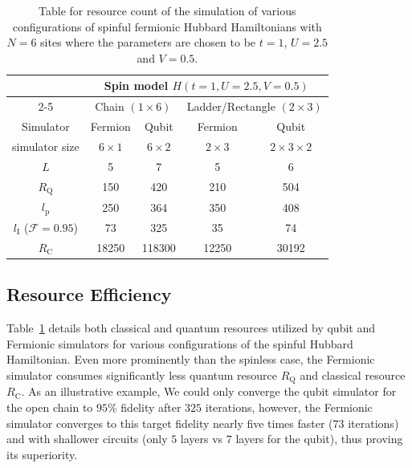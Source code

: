 \documentclass[aps, prx, reprint, superscriptaddress]{revtex4-2}
\begin{document}
\begin{table}[t]
\begin{tabular}{|c|cccc|}
\hline
&\multicolumn{4}{c|}{Spin model $H(t{=}1,U{=}2.5,V{=}0.5)$ }\\ 
\cline{2-5} 
\multirow{3}{*}{} &  
\multicolumn{2}{c|}{Chain $(1{\times} 6)$}  & 
\multicolumn{2}{c|}{Ladder/Rectangle $(2{\times} 3)$} \\ 
\hline
Simulator     & 
\multicolumn{1}{c|}{Fermion} & 
\multicolumn{1}{c|}{Qubit} & 
\multicolumn{1}{c|}{Fermion} & 
\multicolumn{1}{c|}{Qubit} \\ 
\hline
simulator size &  
\multicolumn{1}{c|}{$6{\times} 1$} & 
\multicolumn{1}{c|}{$6{\times} 2$} & 
\multicolumn{1}{c|}{$2{\times} 3$} &
\multicolumn{1}{c|}{$2{\times} 3{\times} 2$}  \\ 
\hline
$L$        &        
\multicolumn{1}{c|}{5} & 
\multicolumn{1}{c|}{7} & 
\multicolumn{1}{c|}{5} & 6     \\ 
\hline
$R_\text{Q}$  & 
\multicolumn{1}{c|}{150} & 
\multicolumn{1}{c|}{420} & 
\multicolumn{1}{c|}{210} & 504   \\ 
\hline
$l_\text{p}$           & 
\multicolumn{1}{c|}{250} & 
\multicolumn{1}{c|}{364} & 
\multicolumn{1}{c|}{350} & 408   \\ 
\hline
$l_{\text{I}}$ ($\mathcal{F}{=}0.95$)                 
& \multicolumn{1}{c|}{73}      
& \multicolumn{1}{c|}{325}     
& \multicolumn{1}{c|}{35}     & 74    \\ 
\hline
$R_\text{C}$   &  
\multicolumn{1}{c|}{18250}   & 
\multicolumn{1}{c|}{118300}   & 
\multicolumn{1}{c|}{12250}   & 30192 \\ \hline
\end{tabular}
\caption{Table for resource count of the simulation of various configurations of spinful fermionic Hubbard Hamiltonians with $N{=}6$ sites where the parameters are chosen to be $t{=}1$, $U{=}2.5$ and $V{=}0.5$.}
\label{table:spinful}
\end{table}

\subsection{Resource Efficiency}
\label{subsec:spinful_efficiency}
Table~\ref{table:spinful} details both classical and quantum resources utilized by qubit and Fermionic simulators for various configurations of the spinful Hubbard Hamiltonian. Even more prominently than the spinless case, the Fermionic simulator consumes significantly less quantum resource $R_\text{Q}$ and classical resource $R_\text{C}$. As an illustrative example, We could only converge the qubit simulator for the open chain to $95\%$ fidelity after  $325$ iterations, however, the Fermionic simulator converges to this target fidelity nearly five times faster ($73$ iterations) and with shallower circuits (only $5$ layers vs $7$ layers for the qubit), thus proving its superiority.
\end{document}
